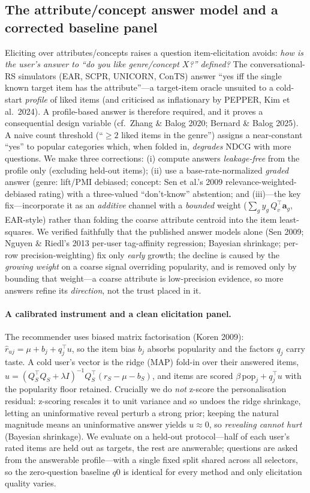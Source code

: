 \subsection{The attribute/concept answer model and a corrected baseline panel}\label{sec:answermodel}
Eliciting over attributes/concepts raises a question item-elicitation avoids: \emph{how is the user's answer to
``do you like genre/concept $X$?'' defined?} The conversational-RS simulators (EAR, SCPR, UNICORN, ConTS) answer
``yes iff the single known target item has the attribute''---a target-item oracle unsuited to a cold-start
\emph{profile} of liked items (and criticised as inflationary by PEPPER, Kim et al.\ 2024). A profile-based answer
is therefore required, and it proves a consequential design variable (cf.\ Zhang \& Balog 2020; Bernard \& Balog
2025). A naive count threshold (``$\ge 2$ liked items in the genre'') assigns a near-constant ``yes'' to popular
categories which, when folded in, \emph{degrades} NDCG with more questions. We make three corrections: (i) compute
answers \emph{leakage-free} from the profile only (excluding held-out items); (ii) use a base-rate-normalized
\emph{graded} answer (genre: lift/PMI debiased; concept: Sen et al.'s 2009 relevance-weighted-debiased rating) with
a three-valued ``don't-know'' abstention; and (iii)---the key fix---incorporate it as an \emph{additive} channel
with a \emph{bounded} weight ($\sum_g y_g\,Q_v^\top\mathbf a_g$, EAR-style) rather than folding the coarse attribute
centroid into the item least-squares. We verified faithfully that the published answer models alone (Sen 2009;
Nguyen \& Riedl's 2013 per-user tag-affinity regression; Bayesian shrinkage; per-row precision-weighting) fix only
\emph{early} growth; the decline is caused by the \emph{growing weight} on a coarse signal overriding popularity,
and is removed only by bounding that weight---a coarse attribute is low-precision evidence, so more answers refine
its \emph{direction}, not the trust placed in it.

\paragraph{A calibrated instrument and a clean elicitation panel.} The recommender uses biased matrix factorisation
(Koren 2009): $\hat r_{uj}=\mu+b_j+q_j^\top u$, so the item bias $b_j$ absorbs popularity and the factors $q_j$ carry
taste. A cold user's vector is the ridge (MAP) fold-in over their answered items, $u=(Q_S^\top Q_S+\lambda I)^{-1}
Q_S^\top(r_S-\mu-b_S)$, and items are scored $\beta\,\mathrm{pop}_j+q_j^\top u$ with the popularity floor retained.
Crucially we do \emph{not} z-score the personalisation residual: z-scoring rescales it to unit variance and so
undoes the ridge shrinkage, letting an uninformative reveal perturb a strong prior; keeping the natural magnitude
means an uninformative answer yields $u\!\approx\!0$, so \emph{revealing cannot hurt} (Bayesian shrinkage). We
evaluate on a held-out protocol---half of each user's rated items are held out as targets, the rest are answerable;
questions are asked from the answerable profile---with a single fixed split shared across all selectors, so the
zero-question baseline $q0$ is identical for every method and only elicitation quality varies.

